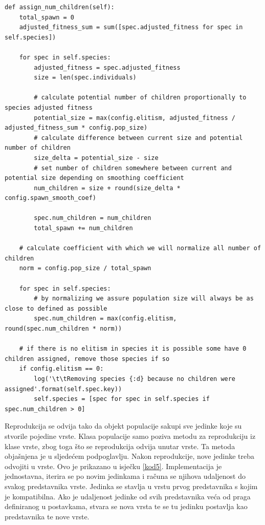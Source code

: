 \documentclass[times, utf8, diplomski, numeric]{fer}
\begin{document}
\begin{lstlisting}[frame=single, label=kod4, caption=Izvorni tekst metode \textit{assign\_num\_children} u klasi \textit{Population}]
def assign_num_children(self):
	total_spawn = 0
	adjusted_fitness_sum = sum([spec.adjusted_fitness for spec in self.species])

	for spec in self.species:
		adjusted_fitness = spec.adjusted_fitness
		size = len(spec.individuals)

		# calculate potential number of children proportionally to species adjusted fitness
		potential_size = max(config.elitism, adjusted_fitness / adjusted_fitness_sum * config.pop_size)
		# calculate difference between current size and potential number of children
		size_delta = potential_size - size
		# set number of children somewhere between current and potential size depending on smoothing coefficient
		num_children = size + round(size_delta * config.spawn_smooth_coef)

		spec.num_children = num_children
		total_spawn += num_children

	# calculate coefficient with which we will normalize all number of children
	norm = config.pop_size / total_spawn

	for spec in self.species:
		# by normalizing we assure population size will always be as close to defined as possible
		spec.num_children = max(config.elitism, round(spec.num_children * norm))

	# if there is no elitism in species it is possible some have 0 children assigned, remove those species if so
	if config.elitism == 0:
		log('\t\tRemoving species {:d} because no children were assigned'.format(self.spec.key))
		self.species = [spec for spec in self.species if spec.num_children > 0]
\end{lstlisting}

Reprodukcija se odvija tako da objekt populacije sakupi sve jedinke koje su stvorile pojedine vrste. Klasa populacije samo poziva metodu za reprodukciju iz klase vrste, zbog toga što se reprodukcija odvija unutar vrste. Ta metoda objašnjena je u sljedećem podpoglavlju. Nakon reprodukcije, nove jedinke treba odvojiti u vrste. Ovo je prikazano u isječku \ref{kod5}. Implementacija je jednostavna, iterira se po novim jedinkama i računa se njihova udaljenost do svakog predstavnika vrste. Jedinka se stavlja u vrstu prvog predstavnika s kojim je kompatibilna. Ako je udaljenost jedinke od svih predstavnika veća od praga definiranog u postavkama, stvara se nova vrsta te se tu jedinku postavlja kao predstavnika te nove vrste.
\end{document}
